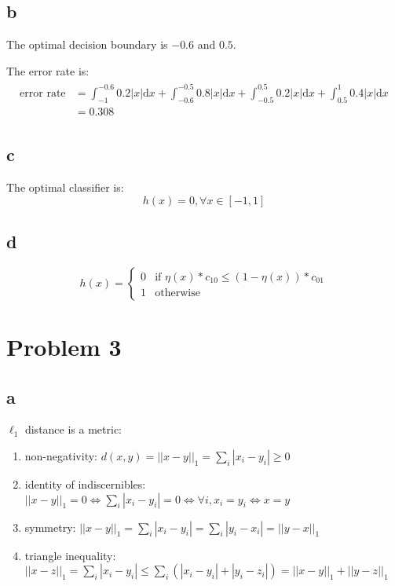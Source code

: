 \documentclass[a4paper,11pt]{article}
\theoremstyle{mytheor}
\begin{document}
\subsection*{b}
The optimal decision boundary is $-0.6$ and $0.5$.

The error rate is:
\begin{align}
	\begin{split}
		\text{error rate} &=  \int_{-1}^{-0.6} 0.2 |x|  \text{d}x + \int_{-0.6}^{-0.5} 0.8 |x|  \text{d}x	
			+ \int_{-0.5}^{0.5} 0.2 |x|  \text{d}x + \int_{0.5}^{1} 0.4 |x|  \text{d}x \\
			& = 0.308		
	\end{split}
\end{align}

\subsection*{c}
The optimal classifier is:
\begin{equation}
	h(x) = 0, \forall x \in [-1, 1]
\end{equation}

\subsection*{d}

\begin{equation}
h(x) = \left\{ \begin{array}{ll}
0 & \mbox{if $\eta(x) * c_{10} \leq (1-\eta(x)) * c_{01} $}\\
1 & \mbox{otherwise} \end{array} 
\right.
\end{equation}

\section*{Problem 3}
\subsection*{a}
$\ell_1$ distance is a metric:
\begin{enumerate}
	\item non-negativity: $d(x,y) = ||x-y||_1 = \sum\limits_{i} |x_i - y_i| \geq 0$
	\item identity of indiscernibles: $||x-y||_1 = 0   \Leftrightarrow \sum\limits_{i} |x_i - y_i| = 0 \Leftrightarrow \forall i, x_i = y_i 
	\Leftrightarrow x = y$ 
	\item symmetry: $||x-y||_1 = \sum\limits_{i}|x_i - y_i| = \sum\limits_{i}|y_i - x_i| = ||y-x||_1$
	\item triangle inequality: $||x-z||_1 = \sum\limits_{i}|x_i - y_i| \leq \sum\limits_{i}(|x_i-y_i| + |y_i-z_i|) = ||x - y||_1 + ||y-z||_1 $
\end{enumerate}
\end{document}
